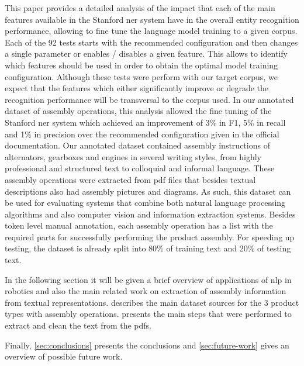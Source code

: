 This paper provides a detailed analysis of the impact that each of the main features available in the Stanford \gls{ner} system have in the overall entity recognition performance, allowing to fine tune the language model training to a given corpus. Each of the 92 tests starts with the recommended configuration and then changes a single parameter or enables / disables a given feature. This allows to identify which features should be used in order to obtain the optimal model training configuration. Although these tests were perform with our target corpus, we expect that the features which either significantly improve or degrade the recognition performance will be transversal to the corpus used. In our annotated dataset of assembly operations, this analysis allowed the fine tuning of the Stanford \gls{ner} system which achieved an improvement of 3\% in F1, 5\% in recall and 1\% in precision over the recommended configuration given in the official documentation. Our annotated dataset contained assembly instructions of alternators, gearboxes and engines in several writing styles, from highly professional and structured text to colloquial and informal language. These assembly operations were extracted from \gls{pdf} files that besides textual descriptions also had assembly pictures and diagrams. As such, this dataset can be used for evaluating systems that combine both natural language processing algorithms and also computer vision and information extraction systems. Besides token level manual annotation, each assembly operation has a list with the required parts for successfully performing the product assembly. For speeding up testing, the dataset is already split into 80\% of training text and 20\% of testing text.

In the following section it will be given a brief overview of applications of \gls{nlp} in robotics and also the main related work on extraction of assembly information from textual representations.  describes the main dataset sources for the 3 product types with assembly operations.  presents the main steps that were performed to extract and clean the text from the \glspl{pdf}.


Finally, \cref{sec:conclusions} presents the conclusions and \cref{sec:future-work} gives an overview of possible future work.
